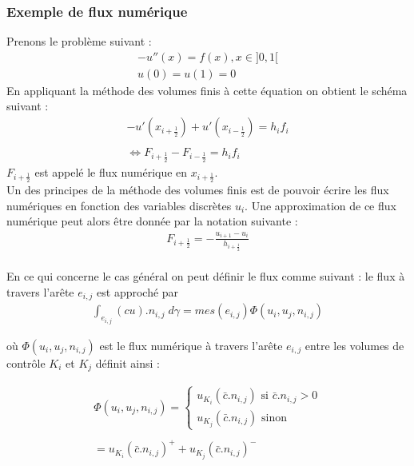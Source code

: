 \documentclass[12pt]{article}
\begin{document}
\subsubsection{Exemple de flux numérique}
\noindent Prenons le problème suivant :
\begin{eqnarray*}
        -u''(x)=f(x) ,  x\in]0,1[
        \\u(0)=u(1)=0
\end{eqnarray*}
En appliquant la méthode des volumes finis à cette équation on obtient le schéma suivant :
\begin{eqnarray*}
        -u'(x_{i+\frac{1}{2}})+u'(x_{i-\frac{1}{2}})=h_if_i
        \\
        \\
        \Leftrightarrow F_{i+\frac{1}{2}} -F_{i-\frac{1}{2}} = h_if_i
\end{eqnarray*}
$F_{i+\frac{1}{2}}$ est appelé le flux numérique en $x_{i+\frac{1}{2}}$.
\\
Un des principes de la méthode des volumes finis est de pouvoir écrire les flux numériques en fonction des variables discrètes $u_i$.
Une approximation de ce flux numérique peut alors être donnée par la notation suivante :
\\
\begin{eqnarray*}
        F_{i+\frac{1}{2}} = -\frac{u_{i+1}-u_i}{h_{i+\frac{1}{2}}}
\end{eqnarray*}
\\
En ce qui concerne le cas général on peut définir le flux comme suivant :
le flux à travers l'arête $e_{i,j}$ est approché par 
\begin{eqnarray*}
       \int_{e_{i,j}} (cu).{n_{i,j}} \; d\gamma=mes(e_{i,j})\Phi(u_i,u_j,n_{i,j})
\end{eqnarray*}

\noindent où $\Phi(u_i,u_j,n_{i,j})$ est le flux numérique à travers l'arête $e_{i,j}$ entre les volumes de contrôle $K_i$ et $K_j$ définit ainsi :

\begin{eqnarray*}
       \Phi(u_i,u_j,n_{i,j})=
        \left\{ 
        \begin{array}{llll}
            u_{K_i}(\bar c.n_{i,j}) \text{ si }\bar c.n_{i,j}> 0 
            \\u_{K_j}(\bar c.n_{i,j}) \text{ sinon}
        \end{array}
    \right .
    \\
    \\
    = u_{K_i}(\bar c.n_{i,j})^+ + u_{K_j}(\bar c.n_{i,j})^-
\end{eqnarray*}
\end{document}
